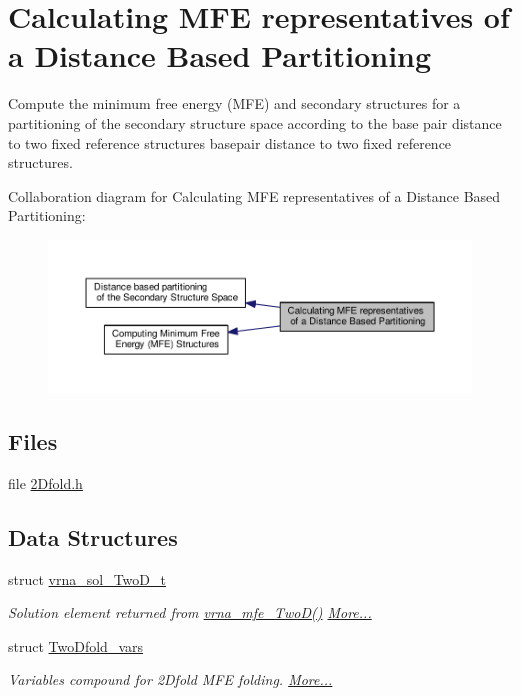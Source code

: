 \hypertarget{group__kl__neighborhood__mfe}{\section{Calculating M\+F\+E representatives of a Distance Based Partitioning}
\label{group__kl__neighborhood__mfe}
}


Compute the minimum free energy (M\+F\+E) and secondary structures for a partitioning of the secondary structure space according to the base pair distance to two fixed reference structures basepair distance to two fixed reference structures.  


Collaboration diagram for Calculating M\+F\+E representatives of a Distance Based Partitioning\+:
\nopagebreak
\begin{figure}[H]
\begin{center}
\leavevmode
\includegraphics[width=350pt]{group__kl__neighborhood__mfe}
\end{center}
\end{figure}
\subsection*{Files}
\begin{DoxyCompactItemize}
\item 
file \hyperlink{2Dfold_8h}{2\+Dfold.\+h}
\end{DoxyCompactItemize}
\subsection*{Data Structures}
\begin{DoxyCompactItemize}
\item 
struct \hyperlink{group__kl__neighborhood__mfe_structvrna__sol__TwoD__t}{vrna\+\_\+sol\+\_\+\+Two\+D\+\_\+t}
\begin{DoxyCompactList}\small\item\em Solution element returned from \hyperlink{group__kl__neighborhood__mfe_ga243c288b463147352829df04de6a2f77}{vrna\+\_\+mfe\+\_\+\+Two\+D()}  \hyperlink{group__kl__neighborhood__mfe_structvrna__sol__TwoD__t}{More...}\end{DoxyCompactList}\item 
struct \hyperlink{group__kl__neighborhood__mfe_structTwoDfold__vars}{Two\+Dfold\+\_\+vars}
\begin{DoxyCompactList}\small\item\em Variables compound for 2\+Dfold M\+F\+E folding.  \hyperlink{group__kl__neighborhood__mfe_structTwoDfold__vars}{More...}\end{DoxyCompactList}\end{DoxyCompactItemize}
